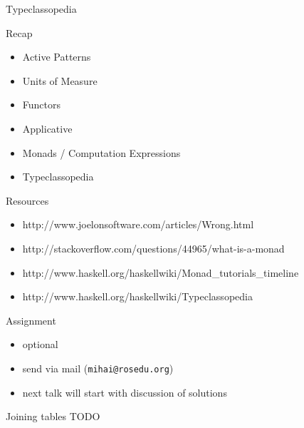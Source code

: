 \documentclass{beamer}
\begin{document}
\begin{frame}{Typeclassopedia}
\end{frame}

\begin{frame}{Recap}
  \begin{itemize}[<+->]
    \item Active Patterns
    \item Units of Measure
    \item Functors
    \item Applicative
    \item Monads / Computation Expressions
    \item Typeclassopedia
  \end{itemize}
\end{frame}

\begin{frame}{Resources}
  \begin{itemize}
    \item http://www.joelonsoftware.com/articles/Wrong.html
    \item http://stackoverflow.com/questions/44965/what-is-a-monad
    \item http://www.haskell.org/haskellwiki/Monad\_tutorials\_timeline
    \item http://www.haskell.org/haskellwiki/Typeclassopedia
  \end{itemize}
\end{frame}

\begin{frame}[fragile]{Assignment}
  \begin{itemize}
    \item optional
    \item send via mail (\texttt{mihai@rosedu.org})
    \item next talk will start with discussion of solutions
  \end{itemize}
  \pause
  \begin{block}{Joining tables}
  TODO
  \end{block}
\end{frame}
\end{document}
